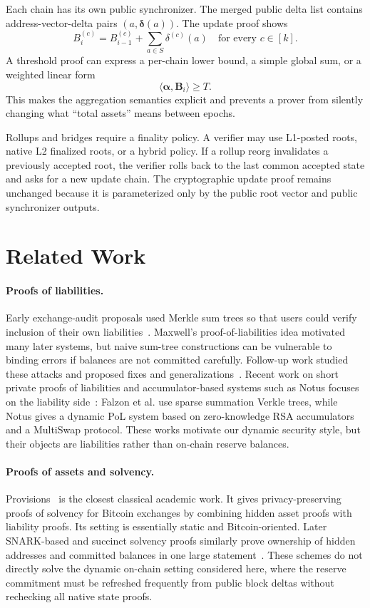 \documentclass[runningheads]{llncs}
\newcommand{\inner}[2]{\langle #1,#2\rangle}
\begin{document}
Each chain has its own public synchronizer.  The merged public delta list contains address-vector-delta pairs \((a,\boldsymbol\delta(a))\).  The update proof shows
\[
        B_i^{(c)}=B_{i-1}^{(c)}+\sum_{a\in S}\delta^{(c)}(a)
        \quad\text{for every }c\in[k].
\]
A threshold proof can express a per-chain lower bound, a simple global sum, or a weighted linear form
\[
        \inner{\boldsymbol\alpha}{\mathbf B_i}\ge T.
\]
This makes the aggregation semantics explicit and prevents a prover from silently changing what ``total assets'' means between epochs.

Rollups and bridges require a finality policy.  A verifier may use L1-posted roots, native L2 finalized roots, or a hybrid policy.  If a rollup reorg invalidates a previously accepted root, the verifier rolls back to the last common accepted state and asks for a new update chain.  The cryptographic update proof remains unchanged because it is parameterized only by the public root vector and public synchronizer outputs.

\section{Related Work}

\paragraph{Proofs of liabilities.}
Early exchange-audit proposals used Merkle sum trees so that users could verify inclusion of their own liabilities~\cite{Maxwell14}.  Maxwell's proof-of-liabilities idea motivated many later systems, but naive sum-tree constructions can be vulnerable to binding errors if balances are not committed carefully.  Follow-up work studied these attacks and proposed fixes and generalizations~\cite{Hu18,Ji21}.  Recent work on short private proofs of liabilities and accumulator-based systems such as Notus focuses on the liability side~\cite{Falzon23,Notus24}: Falzon et al. use sparse summation Verkle trees, while Notus gives a dynamic PoL system based on zero-knowledge RSA accumulators and a MultiSwap protocol.  These works motivate our dynamic security style, but their objects are liabilities rather than on-chain reserve balances.

\paragraph{Proofs of assets and solvency.}
Provisions~\cite{Provisions15} is the closest classical academic work.  It gives privacy-preserving proofs of solvency for Bitcoin exchanges by combining hidden asset proofs with liability proofs.  Its setting is essentially static and Bitcoin-oriented.  Later SNARK-based and succinct solvency proofs similarly prove ownership of hidden addresses and committed balances in one large statement~\cite{Reddy22,Xiezhi24}.  These schemes do not directly solve the dynamic on-chain setting considered here, where the reserve commitment must be refreshed frequently from public block deltas without rechecking all native state proofs.
\end{document}
